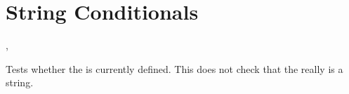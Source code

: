 \documentclass[oneside]{book}
\begin{document}
%

\section{String Conditionals}

\begin{function}{\StrIfExist,\StrIfExistTF}
\begin{syntax}
 
   
\end{syntax}
Tests whether the  is currently defined.  This does not
check that the  really is a string.
\begin{demohigh}
\StrIfExistTF{}
\StrIfExistTF{}
\end{demohigh}
\end{function}
\end{document}
